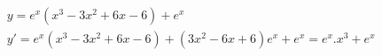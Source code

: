 \begin{ex}
\begin{align}
&y=e^x(x^3-3x^2+6x-6)+e^x\nonumber\\
&y'=e^x(x^3-3x^2+6x-6)+(3x^2-6x+6)e^x+e^x=e^x.x^3+e^x\nonumber
\end{align}
\end{ex}